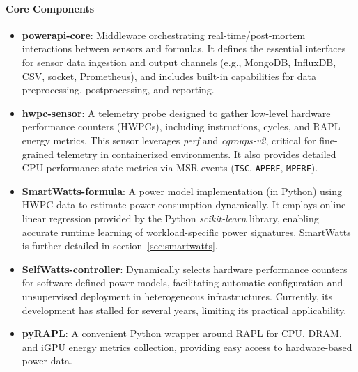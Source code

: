 \paragraph{Core Components}
\begin{itemize}
    \item \textbf{powerapi-core}: Middleware orchestrating real-time/post-mortem interactions between sensors and formulas. It defines the essential interfaces for sensor data ingestion and output channels (e.g., MongoDB, InfluxDB, CSV, socket, Prometheus), and includes built-in capabilities for data preprocessing, postprocessing, and reporting.
    \item \textbf{hwpc-sensor}: A telemetry probe designed to gather low-level hardware performance counters (HWPCs), including instructions, cycles, and RAPL energy metrics. This sensor leverages \textit{perf} and \textit{cgroups-v2}, critical for fine-grained telemetry in containerized environments. It also provides detailed CPU performance state metrics via MSR events (\texttt{TSC}, \texttt{APERF}, \texttt{MPERF}).
    \item \textbf{SmartWatts-formula}\parencite{fieni2020smartwatts}: A power model implementation (in Python) using HWPC data to estimate power consumption dynamically. It employs online linear regression provided by the Python \textit{scikit-learn}\parencite{scikit-learn} library, enabling accurate runtime learning of workload-specific power signatures. SmartWatts is further detailed in section~\ref{sec:smartwatts}.
    \item \textbf{SelfWatts-controller}: Dynamically selects hardware performance counters for software-defined power models, facilitating automatic configuration and unsupervised deployment in heterogeneous infrastructures. Currently, its development has stalled for several years, limiting its practical applicability.
    \item \textbf{pyRAPL}: A convenient Python wrapper around RAPL for CPU, DRAM, and iGPU energy metrics collection, providing easy access to hardware-based power data.
\end{itemize}

